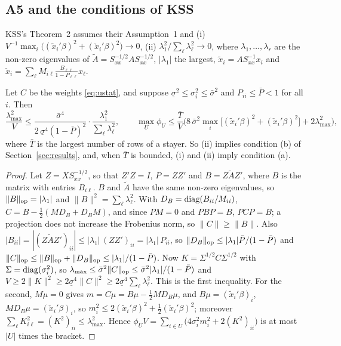 \subsection{A5 and the conditions of KSS}

KSS's Theorem~2 assumes their Assumption~1 and
(i) $V^{-1}\max_i\big((\tilde x_i'\beta)^2+(\check x_i'\beta)^2\big)\to0$,
(ii) $\lambda_1^2/\sum_\ell\lambda_\ell^2\to0$, where $\lambda_1,\dots,\lambda_r$ are the non-zero eigenvalues of
$\tilde A=S_{xx}^{-1/2}AS_{xx}^{-1/2}$, $|\lambda_1|$ the largest, $\tilde x_i=AS_{xx}^{-1}x_i$ and
$\check x_i=\sum_\ell M_{i\ell}\frac{B_{\ell\ell}}{1-P_{\ell\ell}}x_\ell$.

\begin{lemma}\label{lem:kss}
Let $C$ be the weights \eqref{eq:ustat}, and suppose $\underline\sigma^2\le\sigma_i^2\le\bar\sigma^2$ and
$P_{ii}\le\bar P<1$ for all $i$. Then
\[
\frac{\lambda_{\max}^2}{V}\le\frac{\bar\sigma^4}{2\,\underline\sigma^4(1-\bar P)^2}\cdot\frac{\lambda_1^2}{\sum_\ell\lambda_\ell^2},
\qquad
\max_U\phi_U\le\frac{\bar T}{V}\Big(8\,\bar\sigma^2\max_i\big[(\tilde x_i'\beta)^2+(\check x_i'\beta)^2\big]+2\lambda_{\max}^2\Big),
\]
where $\bar T$ is the largest number of rows of a stayer. So \textup{(ii)} implies condition \textup{(b)} of
Section~\ref{sec:results}, and, when $\bar T$ is bounded, \textup{(i)} and \textup{(ii)} imply condition \textup{(a)}.
\end{lemma}

\begin{proof}
Let $Z=XS_{xx}^{-1/2}$, so that $Z'Z=I$, $P=ZZ'$ and $B=Z\tilde AZ'$, where $B$ is the matrix with entries
$B_{i\ell}$. $B$ and $\tilde A$ have the same non-zero eigenvalues, so $\|B\|_{\mathrm{op}}=|\lambda_1|$ and
$\|B\|^2=\sum_\ell\lambda_\ell^2$. With $D_B=\operatorname{diag}(B_{ii}/M_{ii})$, $C=B-\frac12(MD_B+D_BM)$, and since $PM=0$
and $PBP=B$, $PCP=B$; a projection does not increase the Frobenius norm, so $\|C\|\ge\|B\|$. Also
$|B_{ii}|=|(Z\tilde AZ')_{ii}|\le|\lambda_1|\,(ZZ')_{ii}=|\lambda_1|\,P_{ii}$, so
$\|D_B\|_{\mathrm{op}}\le|\lambda_1|\bar P/(1-\bar P)$ and $\|C\|_{\mathrm{op}}\le\|B\|_{\mathrm{op}}+\|D_B\|_{\mathrm{op}}\le|\lambda_1|/(1-\bar P)$. Now
$K=\Sigma^{1/2}C\Sigma^{1/2}$ with $\Sigma=\operatorname{diag}(\sigma_i^2)$, so
$\lambda_{\max}\le\bar\sigma^2\|C\|_{\mathrm{op}}\le\bar\sigma^2|\lambda_1|/(1-\bar P)$ and
$V\ge2\|K\|^2\ge2\underline\sigma^4\|C\|^2\ge2\underline\sigma^4\sum_\ell\lambda_\ell^2$. This is the first
inequality. For the second, $M\mu=0$ gives $m=C\mu=B\mu-\frac12MD_B\mu$, and $B\mu=(\tilde x_i'\beta)_i$,
$MD_B\mu=(\check x_i'\beta)_i$, so $m_i^2\le2(\tilde x_i'\beta)^2+\frac12(\check x_i'\beta)^2$; moreover
$\sum_\ell K_{i\ell}^2=(K^2)_{ii}\le\lambda_{\max}^2$. Hence
$\phi_UV=\sum_{i\in U}\big(4\sigma_i^2m_i^2+2(K^2)_{ii}\big)$ is at most $|U|$ times the bracket.
\end{proof}

